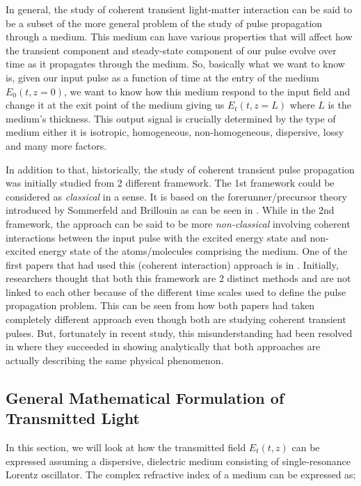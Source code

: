 In general, the study of coherent transient light-matter interaction can be said to be a subset of the more general problem of the study of pulse propagation through a medium. This medium can have various properties that will affect how the transient component and steady-state component of our pulse evolve over time as it propagates through the medium. So, basically what we want to know is, given our input pulse as a function of time at the entry of the medium $E_{0}(t, z = 0)$, we want to know how this medium respond to the input field and change it at the exit point of the medium giving us $E_{t}(t, z = L)$ where $L$ is the medium's thickness. This output signal is crucially determined by the type of medium either it is isotropic, homogeneous, non-homogeneous, dispersive, lossy and many more factors.

In addition to that, historically, the study of coherent transient pulse propagation was initially studied from 2 different framework. The 1st framework could be considered as \textit{classical} in a sense. It is based on the forerunner/precursor theory introduced by Sommerfeld and Brillouin as can be seen in . While in the 2nd framework, the approach can be said to be more \textit{non-classical} involving coherent interactions between the input pulse with the excited energy state and non-excited energy state of the atoms/molecules comprising the medium. One of the first papers that had used this (coherent interaction) approach is in . Initially, researchers thought that both this framework are 2 distinct methods and are not linked to each other because of the different time scales used to  define the pulse propagation problem. This can be seen from how both papers  had taken completely different approach even though both are studying coherent transient pulses. But, fortunately in recent study, this misunderstanding had been resolved in  where they succeeded in showing analytically that both approaches are actually describing the same physical phenomenon.

\subsection{General Mathematical Formulation of Transmitted Light}\label{general}
In this section, we will look at how the transmitted field $E_{t}(t, z)$ can be expressed assuming a dispersive, dielectric medium consisting of single-resonance Lorentz oscillator. The complex refractive index of a medium can be expressed as;

